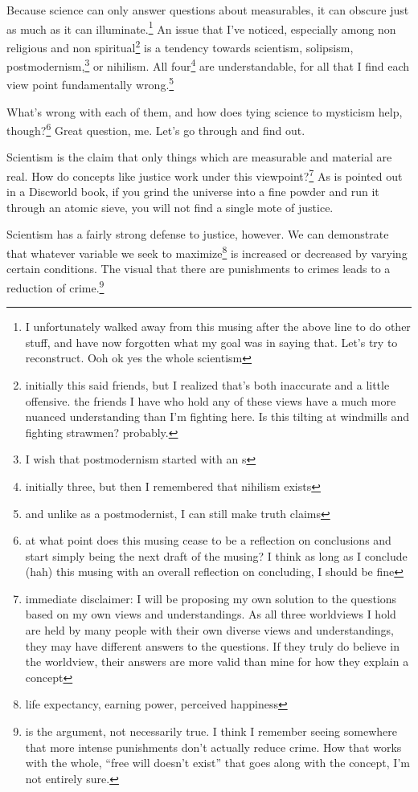 \documentclass[12pt]{article}[titlepage]
\newcommand{\say}[1]{``#1''}
\newcommand{\1}{\={a}}
\newcommand{\2}{\={e}}
\newcommand{\3}{\={\i}}
\newcommand{\4}{\=o}
\newcommand{\5}{\=u}
\newcommand{\6}{\={A}}
\renewcommand{\,}{\textsuperscript{,}}
\begin{document}
Because science can only answer questions about measurables, it can obscure just as much as it can illuminate.\footnote{I unfortunately walked away from this musing after the above line to do other stuff, and have now forgotten what my goal was in saying that. Let's try to reconstruct.
Ooh ok yes the whole scientism}
An issue that I've noticed, especially among non religious and non spiritual\footnote{initially this said friends, but I realized that's both inaccurate and a little offensive. the friends I have who hold any of these views have a much more nuanced understanding than I'm fighting here. Is this tilting at windmills and fighting strawmen? probably.} is a tendency towards scientism, solipsism, postmodernism,\footnote{I wish that postmodernism started with an s} or nihilism.
All four\footnote{initially three, but then I remembered that nihilism exists} are understandable, for all that I find each view point fundamentally wrong.\footnote{and unlike as a postmodernist, I can still make truth claims}

What's wrong with each of them, and how does tying science to mysticism help, though?\footnote{at what point does this musing cease to be a reflection on conclusions and start simply being the next draft of the musing?
I think as long as I conclude (hah) this musing with an overall reflection on concluding, I should be fine}
Great question, me.
Let's go through and find out.

Scientism is the claim that only things which are measurable and material are real.
How do concepts like justice work under this viewpoint?\footnote{immediate disclaimer: I will be proposing my own solution to the questions based on my own views and understandings.
As all three worldviews I hold are held by many people with their own diverse views and understandings, they may have different answers to the questions.
If they truly do believe in the worldview, their answers are more valid than mine for how they explain a concept}
As is pointed out in a Discworld book, if you grind the universe into a fine powder and run it through an atomic sieve, you will not find a single mote of justice.

Scientism has a fairly strong defense to justice, however.
We can demonstrate that whatever variable we seek to maximize\footnote{life expectancy, earning power, perceived happiness} is increased or decreased by varying certain conditions.
The visual that there are punishments to crimes leads to a reduction of crime.\footnote{is the argument, not necessarily true. I think I remember seeing somewhere that more intense punishments don't actually reduce crime.
How that works with the whole, \say{free will doesn't exist} that goes along with the concept, I'm not entirely sure.}
\end{document}
